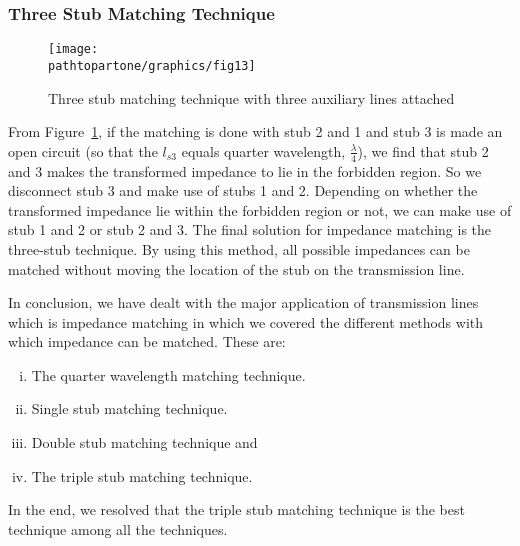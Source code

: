 \subsubsection{Three Stub Matching Technique}
\begin{figure}[h]
\centering
\texttt{[image: \\pathtopartone/graphics/fig13]}
\caption{Three stub matching technique with three auxiliary lines attached}
\label{fig:fig13}
\end{figure}

From Figure~\ref{fig:fig13}, if the matching is done with stub 2 and 1 and stub 3 is made an open circuit (so that the $ l_{s3}$ equals quarter wavelength, $\frac{\lambda}{4}$), we find that stub 2 and 3 makes the transformed impedance to lie in the forbidden region. So we disconnect stub 3 and make use of stubs 1 and 2. Depending on whether the transformed impedance lie within the forbidden region or not, we can make use of stub 1 and 2 or stub 2 and 3. The final solution for impedance matching is the three-stub technique. By using this method, all possible impedances can be matched without moving the location of the stub on the transmission line.

In conclusion, we have dealt with the major application of transmission lines which is impedance matching in which we covered the different methods with which impedance can be matched. These are:
\begin{enumerate}[(i)]
\item The quarter wavelength matching technique.
\item Single stub matching technique.
\item Double stub matching technique and
\item The triple stub matching technique.
\end{enumerate}

In the end, we resolved that the triple stub matching technique is the best technique among all the techniques.


